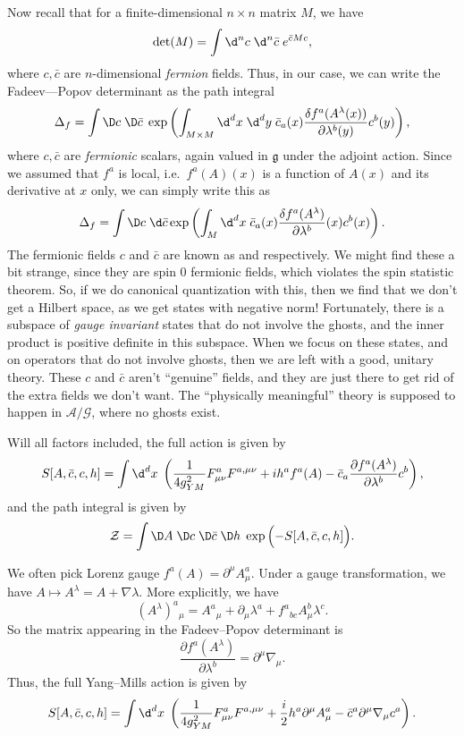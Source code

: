 \documentclass[a4paper]{article}
\begin{document}
Now recall that for a finite-dimensional $n \times n$ matrix $M$, we have
\[
  \det (M) = \int \d^n c\; \d^n \bar{c}\; e^{\bar{c} M c},
\]
where $c, \bar{c}$ are $n$-dimensional \emph{fermion} fields. Thus, in our case, we can write the Fadeev---Popov determinant as the path integral
\[
  \Delta_f = \int \D c\; \D \bar{c}\;\exp \left(\int_{M \times M} \d^d x\;\d^d y\; \bar{c}_a(x) \frac{\delta f^a(A^\lambda(x))}{\partial \lambda^b(y)} c^b(y)\right),
\]
where $c, \bar{c}$ are \emph{fermionic} scalars, again valued in $\mathfrak{g}$ under the adjoint action. Since we assumed that $f^a$ is local, i.e.\ $f^a(A)(x)$ is a function of $A(x)$ and its derivative at $x$ only, we can simply write this as
\[
  \Delta_f = \int \D c\; \d \bar{c} \exp \left(\int_M \d^d x\; \bar{c}_a (x) \frac{\delta f^a(A^\lambda)}{\partial \lambda^b}(x) c^b(x)\right).
\]
The fermionic fields $c$ and $\bar{c}$ are known as  and  respectively. We might find these a bit strange, since they are spin $0$ fermionic fields, which violates the spin statistic theorem. So, if we do canonical quantization with this, then we find that we don't get a Hilbert space, as we get states with negative norm! Fortunately, there is a subspace of \emph{gauge invariant} states that do not involve the ghosts, and the inner product is positive definite in this subspace. When we focus on these states, and on operators that do not involve ghosts, then we are left with a good, unitary theory. These $c$ and $\bar{c}$ aren't ``genuine'' fields, and they are just there to get rid of the extra fields we don't want. The ``physically meaningful'' theory is supposed to happen in $\mathcal{A}/\mathcal{G}$, where no ghosts exist.

Will all factors included, the full action is given by
\[
  S[A, \bar{c}, c, h] = \int \d^d x\; \left(\frac{1}{4g_{YM}^2} F_{\mu\nu}^a F^{a, \mu\nu} + ih^a f^a(A) - \bar{c}_a \frac{\partial f^a(A^\lambda)}{\partial \lambda^b}c^b\right),
\]
and the path integral is given by
\[
  \mathcal{Z} = \int \D A\; \D c\; \D \bar{c}\;\D h\; \exp\Big({-S}[A, \bar{c}, c, h]\Big).
\]
\begin{eg}
  We often pick Lorenz gauge $f^a(A) = \partial^\mu A_\mu^a$. Under a gauge transformation, we have $A \mapsto A^\lambda = A + \nabla \lambda$. More explicitly, we have
  \[
    (A^\lambda)^a\!_\mu = A^a\!_\mu + \partial_\mu \lambda^a + f^a\!_{bc} A_\mu^b \lambda^c.
  \]
  So the matrix appearing in the Fadeev--Popov determinant is
  \[
    \frac{\partial f^a(A^\lambda)}{\partial \lambda^b} = \partial^\mu\nabla_\mu.
  \]
  Thus, the full Yang--Mills action is given by
  \[
    S[A, \bar{c}, c, h] =\int \d^d x\; \left( \frac{1}{4g^2_{YM}} F_{\mu\nu}^a F^{a,\mu\nu} + \frac{i}{2} h^a \partial^\mu A_\mu^a - \bar{c}^a \partial^\mu \nabla_\mu c^a\right).
  \]
\end{eg}
\end{document}
